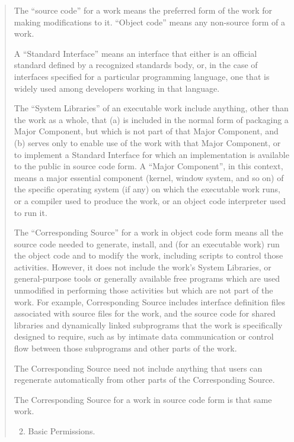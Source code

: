\documentclass[letterpaper,10pt,english]{sphinxmanual}
\begin{document}
\begin{quote}
\begin{enumerate}
\end{enumerate}

The ``source code'' for a work means the preferred form of the work
for making modifications to it.  ``Object code'' means any non-source
form of a work.

A ``Standard Interface'' means an interface that either is an official
standard defined by a recognized standards body, or, in the case of
interfaces specified for a particular programming language, one that
is widely used among developers working in that language.

The ``System Libraries'' of an executable work include anything, other
than the work as a whole, that (a) is included in the normal form of
packaging a Major Component, but which is not part of that Major
Component, and (b) serves only to enable use of the work with that
Major Component, or to implement a Standard Interface for which an
implementation is available to the public in source code form.  A
``Major Component'', in this context, means a major essential component
(kernel, window system, and so on) of the specific operating system
(if any) on which the executable work runs, or a compiler used to
produce the work, or an object code interpreter used to run it.

The ``Corresponding Source'' for a work in object code form means all
the source code needed to generate, install, and (for an executable
work) run the object code and to modify the work, including scripts to
control those activities.  However, it does not include the work's
System Libraries, or general-purpose tools or generally available free
programs which are used unmodified in performing those activities but
which are not part of the work.  For example, Corresponding Source
includes interface definition files associated with source files for
the work, and the source code for shared libraries and dynamically
linked subprograms that the work is specifically designed to require,
such as by intimate data communication or control flow between those
subprograms and other parts of the work.

The Corresponding Source need not include anything that users
can regenerate automatically from other parts of the Corresponding
Source.

The Corresponding Source for a work in source code form is that
same work.
\begin{enumerate}
\setcounter{enumi}{1}
\item {} 
Basic Permissions.

\end{enumerate}


\end{quote}
\end{document}
